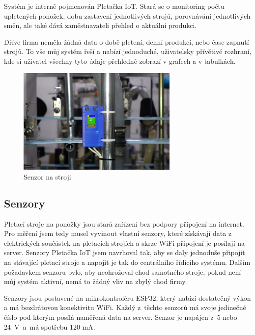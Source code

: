 \documentclass[12pt, a4paper]{article}
\begin{document}
Systém je interně pojmenován Pletačka IoT. Stará se o monitoring počtu upletených ponožek, dobu zastavení jednotlivých strojů, porovnávání jednotlivých směn, ale také dává zaměstnavateli přehled o aktuální produkci.

Dříve firma neměla žádná data o době pletení, denní  produkci, nebo čase zapnutí strojů.
To vše  můj systém řeší  a nabízí jednoduché, uživatelsky přívětivé rozhraní, kde si uživatel všechny tyto údaje přehledně zobrazí v grafech a v tabulkách.

\begin{figure}[t]
    \centering
    \includegraphics[width=0.7\textwidth]{img/V2-uchyceni.png}
    \caption{Senzor na stroji}
    \label{fig:SenzorNaStroji}
\end{figure}


\subsection*{Senzory}

Pletací stroje na ponožky jsou stará zařízení bez podpory připojení na internet. 
Pro měření jsem tedy musel vyvinout vlastní  senzory, které získávají data z elektrických součástek na pletacích  strojích a skrze WiFi připojení je posílají  na server.
Senzory Pletačka IoT jsem navrhoval tak, aby se daly jednoduše připojit na stávající pletací stroje a napojit je tak do centrálního řídícího systému.
Dalším požadavkem senzoru bylo, aby neohrožoval chod samotného stroje, pokud není můj systém aktivní, nemá to žádný vliv na zbylý chod firmy.

Senzory jsou postavené na mikrokontroléru ESP32, který nabízí dostatečný výkon a má bezdrátovou konektivitu WiFi.
Každý z~těchto senzorů má svoje jedinečné číslo pod kterým posílá naměřená data na server.
Senzor je napájen z~5 nebo 24~V~a~má spotřebu 120 mA.
\end{document}
